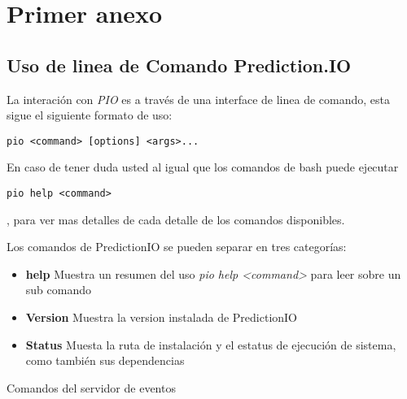 \chapter{Primer anexo}
\label{ch:anexo-a}


\section{Uso de linea de Comando Prediction.IO}


La interación con \emph{PIO} es a través de una interface de linea de comando, esta sigue el siguiente formato de uso:

 

\begin{lstlisting}[frame=single,basicstyle=\ttfamily\tiny,]
pio <command> [options] <args>...
\end{lstlisting}

En caso de tener duda usted al igual que los comandos de bash puede ejecutar

\begin{lstlisting}[frame=single,basicstyle=\ttfamily\tiny,]
pio help <command> 
\end{lstlisting}, para ver mas detalles de cada detalle de los comandos disponibles.


Los comandos de PredictionIO se pueden separar en tres categorías:

\begin{itemize}
	\item \textbf{help} Muestra un resumen del uso  \emph{pio help <command>} para leer sobre un sub comando
	
	\item \textbf{Version} Muestra la version instalada de PredictionIO
	
	
	\item \textbf{Status} Muesta la ruta de instalación y el estatus de ejecución de sistema, como también sus dependencias
	
\end{itemize}

Comandos del servidor de eventos



